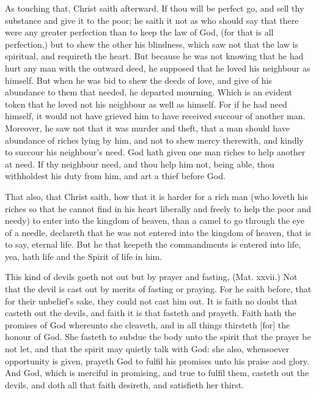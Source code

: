 As touching that, Christ saith afterward. If thou will be 
perfect go, and sell thy substance and give it to the poor; 
he saith it not as who should say that there were any greater 
perfection than to keep the law of God, (for that is all perfection,)
but to shew the other his blindness, which saw not 
that the law is spiritual, and requireth the heart. But 
because he was not knowing that he had hurt any man with 
the outward deed, he supposed that he loved his neighbour 
as himself. But when he was bid to shew the deeds of 
love, and give of his abundance to them that needed, he departed
mourning. Which is an evident token that he 
loved not his neighbour as well as himself. For if he had 
need himself, it would not have grieved him to have received
succour of another man. Moreover, he saw not that it 
was murder and theft, that a man should have abundance 
of riches lying by him, and not to shew mercy therewith, 
and kindly to succour his neighbour's need. God hath 
given one man riches to help another at need. If thy 
neighbour need, and thou help him not, being able, thou 
withholdest his duty from him, and art a thief before God. 

That also, that Christ saith, how that it is harder for a 
rich man (who loveth his riches so that he cannot find in 
his heart liberally and freely to help the poor and needy) 
to enter into the kingdom of heaven, than a camel to go 
through the eye of a needle, declareth that he was not entered
into the kingdom of heaven, that is to say, eternal 
life. But he that keepeth the commandments is entered 
into life, yea, hath life and the Spirit of life in him. 


This kind of devils goeth not out but by prayer and 
fasting, (Mat. xxvii.) Not that the devil is cast out by 
merits of fasting or praying. For he saith before, that for 
their unbelief's sake, they could not cast him out. It is 
faith no doubt that casteth out the devils, and faith it is 
that fasteth and prayeth. Faith hath the promises of God 
whereunto she cleaveth, and in all things thirsteth [for] the 
honour of God. She fasteth to subdue the body unto the 
spirit that the prayer be not let, and that the spirit may 
quietly talk with God: she also, whensoever opportunity is 
given, prayeth God to fulfil his promises unto his praise 
aod glory. And God, which is merciful in promising, and 
true to fulfil them, casteth out the devils, and doth all that 
faith desireth, and satisfieth her thirst. 


